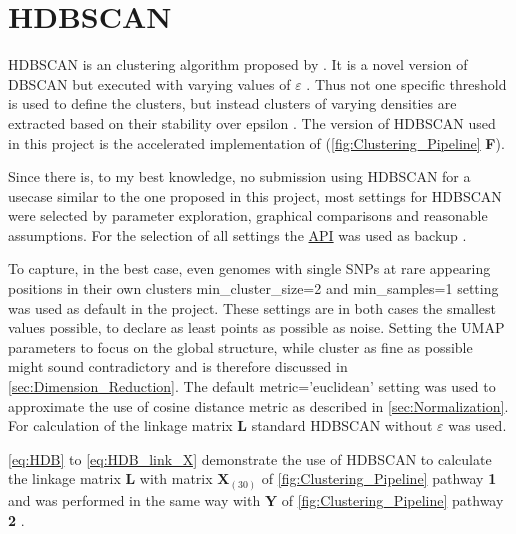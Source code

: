 \section{HDBSCAN} \label{sec:HDBSCAN}

\gls{HDBSCAN} is an clustering algorithm proposed by \textcite{campello_hierarchical_2015, hutchison_density-based_2013}. It is a novel version of \gls{DBSCAN} but executed with varying values of $\varepsilon$ \autocite{hutchison_density-based_2013}. Thus not one specific threshold is used to define the clusters, but instead clusters of varying densities are extracted based on their stability over epsilon \autocite{mcinnes_hdbscan_2017}. The version of \gls{HDBSCAN} used in this project is the accelerated implementation of \textcite{mcinnes_accelerated_2017} (\autoref{fig:Clustering_Pipeline} \textsf{\textbf{F}}).

Since there is, to my best knowledge, no submission using \gls{HDBSCAN} for a usecase similar to the one proposed in this project, most settings for \gls{HDBSCAN} were selected by parameter exploration, graphical comparisons and reasonable assumptions. For the selection of all settings the \href{https://hdbscan.readthedocs.io/en/latest/api.html}{API} was used as backup \autocite{mcinnes_hdbscan_2017}. 

To capture, in the best case, even genomes with single \glspl{SNP} at rare appearing positions in their own clusters \colorbox{backcolour}{min\_cluster\_size=2} and \colorbox{backcolour}{min\_samples=1} setting was used as default in the project. These settings are in both cases the smallest values possible, to declare as least points as possible as noise. Setting the \gls{UMAP} parameters to focus on the global structure, while cluster as fine as possible might sound contradictory and is therefore discussed in \autoref{sec:Dimension_Reduction}. The default \colorbox{backcolour}{metric='euclidean'} setting was used to approximate the use of cosine distance metric as described in \autoref{sec:Normalization}. For calculation of the linkage matrix $\mathbf{L}$ standard \gls{HDBSCAN} without $\varepsilon$ was used.

\autoref{eq:HDB} to \autoref{eq:HDB_link_X} demonstrate the use of \gls{HDBSCAN} to calculate the linkage matrix $\mathbf{L}$ with matrix $\mathbf{X}_{(30)}$ of \autoref{fig:Clustering_Pipeline} pathway \textsf{\textbf{1}} and was performed in the same way with $\mathbf{Y}$ of \autoref{fig:Clustering_Pipeline} pathway \textsf{\textbf{2}} \autocite{mcinnes_hdbscan_2017, gower_minimum_1969}.

